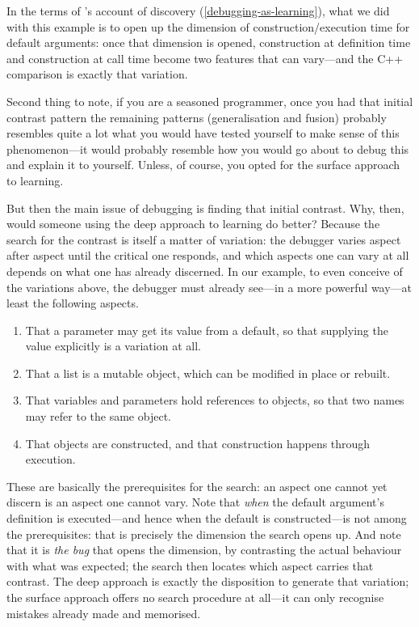 In the terms of \citeauthor{NCOL}'s account of discovery
(\cref{debugging-as-learning}), what we did with this example is to open up
the dimension of construction/execution time for default arguments: once
that dimension is opened, construction at definition time and construction
at call time become two features that can vary---and the C++ comparison is
exactly that variation.

Second thing to note, if you are a seasoned programmer, once you had that
initial contrast pattern the remaining patterns (generalisation and fusion)
probably resembles quite a lot what you would have tested yourself to make
sense of this phenomenon---it would probably resemble how you would go about to
debug this and explain it to yourself.
Unless, of course, you opted for the surface approach to learning.

But then the main issue of debugging is finding that initial contrast.
Why, then, would someone using the deep approach to learning do better?
Because the search for the contrast is itself a matter of variation: the
debugger varies aspect after aspect until the critical one responds, and
which aspects one can vary at all depends on what one has already
discerned.
In our example, to even conceive of the variations above, the debugger must
already see---in a more powerful way---at least the following aspects.
\begin{enumerate}
  \item That a parameter may get its value from a default, so that
    supplying the value explicitly is a variation at all.
  \item That a list is a mutable object, which can be modified in place or
    rebuilt.
  \item That variables and parameters hold references to objects, so that
    two names may refer to the same object.
  \item That objects are constructed, and that construction happens through
    execution.
\end{enumerate}
These are basically the prerequisites for the search: an aspect one cannot
yet discern is an aspect one cannot vary.
Note that \emph{when} the default argument's definition is executed---and
hence when the default is constructed---is not among the prerequisites:
that is precisely the dimension the search opens up.
And note that it is \emph{the bug} that opens the dimension, by contrasting the
actual behaviour with what was expected; the search then locates which
aspect carries that contrast.
The deep approach is exactly the disposition to generate that variation;
the surface approach offers no search procedure at all---it can only
recognise mistakes already made and memorised.

